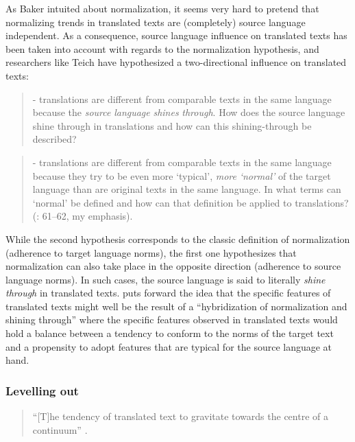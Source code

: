 As Baker intuited about normalization, it seems very hard to pretend that normalizing trends in translated texts are (completely) source language independent. As a consequence, source language influence on translated texts has been taken into account with regards to the normalization hypothesis, and researchers like Teich have hypothesized a two-directional influence on translated texts:


\begin{quote}
{}- translations are different from comparable texts in the same language because the \textit{source} \textit{language} \textit{shines} \textit{through}. How does the source language shine through in translations and how can this shining-through be described?
\end{quote}

\begin{quote}
{}- translations are different from comparable texts in the same language because they try to be even more ‘typical’, \textit{more} \textit{‘normal’} of the target language than are original texts in the same language. In what terms can ‘normal’ be defined and how can that definition be applied to translations? (\citealt{teich_cross-linguistic_2003}: 61–62, my emphasis).
\end{quote}


While the second hypothesis corresponds to the classic definition of normalization (adherence to target language norms), the first one hypothesizes that normalization can also take place in the opposite direction (adherence to source language norms). In such cases, the source language is said to literally \textit{shine} \textit{through} in translated texts. \citet[136]{kranich_between_2011} puts forward the idea that the specific features of translated texts might well be the result of a “hybridization of normalization and shining through” where the specific features observed in translated texts would hold a balance between a tendency to conform to the norms of the target text and a propensity to adopt features that are typical for the source language at hand.


\subsubsection{\label{sec:2.2.2.4}  Levelling out}
\begin{quote}
“[T]he tendency of translated text to gravitate towards the centre of a continuum”  \citep[184]{Baker1996}.
\end{quote}


